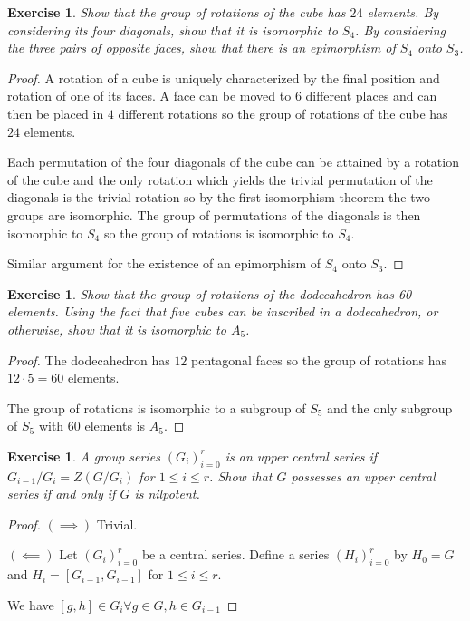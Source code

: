 \documentclass{article}
\newtheorem{exercise}[theorem]{Exercise}
\begin{document}
\begin{exercise}
Show that the group of rotations of the cube has $24$ elements. By considering its four diagonals, show that it is isomorphic to $S_4$. By considering the three pairs of opposite faces, show that there is an epimorphism of $S_4$ onto $S_3$.
\end{exercise}
\begin{proof}
A rotation of a cube is uniquely characterized by the final position and rotation of one of its faces. A face can be moved to $6$ different places and can then be placed in $4$ different rotations so the group of rotations of the cube has $24$ elements.

Each permutation of the four diagonals of the cube can be attained by a rotation of the cube and the only rotation which yields the trivial permutation of the diagonals is the trivial rotation so by the first isomorphism theorem the two groups are isomorphic. The group of permutations of the diagonals is then isomorphic to $S_4$ so the group of rotations is isomorphic to $S_4$.

Similar argument for the existence of an epimorphism of $S_4$ onto $S_3$.
\end{proof}

\begin{exercise}
Show that the group of rotations of the dodecahedron has 60 elements. Using the fact that five cubes can be inscribed in a dodecahedron, or otherwise, show that it is isomorphic to $A_5$.
\end{exercise}
\begin{proof}
The dodecahedron has $12$ pentagonal faces so the group of rotations has $12\cdot 5=60$ elements.

The group of rotations is isomorphic to a subgroup of $S_5$ and the only subgroup of $S_5$ with $60$ elements is $A_5$.
\end{proof}

\begin{exercise}
A group series $(G_i)_{i=0}^r$ is an upper central series if $G_{i-1}/G_i=Z(G/G_i)$ for $1\leq i\leq r$. Show that $G$ possesses an upper central series if and only if $G$ is nilpotent.
\end{exercise}
\begin{proof}
$(\implies)$ Trivial.

$(\impliedby)$ Let $(G_i)_{i=0}^r$ be a central series. Define a series $(H_i)_{i=0}^r$ by $H_0=G$ and $H_i=[G_{i-1},G_{i-1}]$ for $1\leq i\leq r$.

We have $[g,h]\in G_i\forall g\in G,h\in G_{i-1}$
\end{proof}
\end{document}
